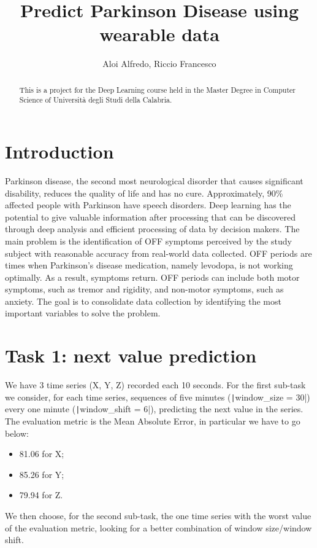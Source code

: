 \documentclass[12pt,a4paper,leqno]{article}
\title{Predict Parkinson Disease using wearable data}
\author{Aloi Alfredo, Riccio Francesco}
\begin{document}
	
	\maketitle
	
	\begin{abstract}
		This is a project for the Deep Learning course held in the Master Degree in Computer Science of Università degli Studi della Calabria.
	\end{abstract}
	
	\newpage
	
	\tableofcontents
	
	\newpage
	
	\section{Introduction}
	Parkinson disease, the second most neurological disorder that causes significant disability, reduces the quality of life and has no cure. Approximately, 90\% affected people with Parkinson have speech disorders. Deep learning has the potential to give valuable information after processing that can be discovered through deep analysis and efficient processing of data by decision makers. The main problem is the identification of OFF symptoms perceived by the study subject with reasonable accuracy from real-world data collected. OFF periods are times when Parkinson’s disease medication, namely levodopa, is not working optimally. As a result, symptoms return. OFF periods can include both motor symptoms, such as tremor and rigidity, and non-motor symptoms, such as anxiety. The goal is to consolidate data collection by identifying the most important variables to solve the problem.
	
	\newpage
	
	\section{Task 1: next value prediction}
	We have 3 time series (X, Y, Z) recorded each 10 seconds. For the first sub-task we consider, for each time series, sequences of five minutes (\texttt|window_size = 30|) every one minute (\texttt|window_shift = 6|), predicting the next value in the series. The evaluation metric is the Mean Absolute Error, in particular we have to go below:
	\begin{itemize}
		\item 81.06 for X;
		\item 85.26 for Y;
		\item 79.94 for Z.
	\end{itemize}
	We then choose, for the second sub-task, the one time series with the worst value of the evaluation metric, looking for a better combination of window size/window shift.
	
\end{document}
